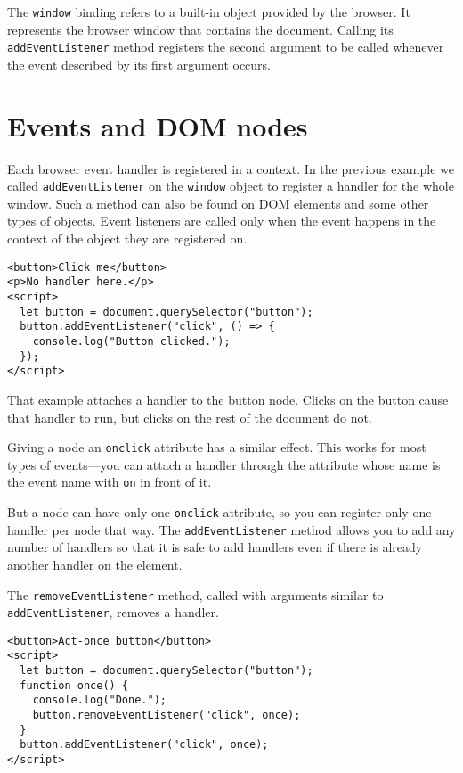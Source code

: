 The \lstinline`window` binding refers to a built-in object provided by the browser. It represents the browser window that contains the document. Calling its \lstinline`addEventListener` method registers the second argument to be called whenever the event described by its first argument occurs.

\section{Events and DOM nodes}

Each browser event handler is registered in a context. In the previous example we called \lstinline`addEventListener` on the \lstinline`window` object to register a handler for the whole window. Such a method can also be found on DOM elements and some other types of objects. Event listeners are called only when the event happens in the context of the object they are registered on.

\begin{lstlisting}
<button>Click me</button>
<p>No handler here.</p>
<script>
  let button = document.querySelector("button");
  button.addEventListener("click", () => {
    console.log("Button clicked.");
  });
</script>
\end{lstlisting}
\noindent{}

That example attaches a handler to the button node. Clicks on the button cause that handler to run, but clicks on the rest of the document do not.

Giving a node an \lstinline`onclick` attribute has a similar effect. This works for most types of events—you can attach a handler through the attribute whose name is the event name with \lstinline`on` in front of it.

But a node can have only one \lstinline`onclick` attribute, so you can register only one handler per node that way. The \lstinline`addEventListener` method allows you to add any number of handlers so that it is safe to add handlers even if there is already another handler on the element.

The \lstinline`removeEventListener` method, called with arguments similar to \lstinline`addEventListener`, removes a handler.

\begin{lstlisting}
<button>Act-once button</button>
<script>
  let button = document.querySelector("button");
  function once() {
    console.log("Done.");
    button.removeEventListener("click", once);
  }
  button.addEventListener("click", once);
</script>
\end{lstlisting}
\noindent{}

